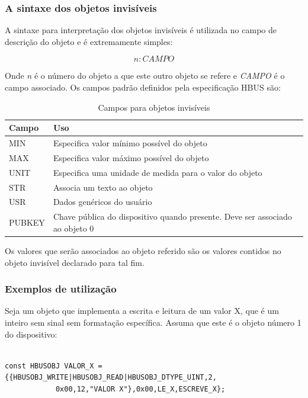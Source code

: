 \documentclass[11pt]{report}
\begin{document}
\subsubsection*{A sintaxe dos objetos invisíveis}

A sintaxe para interpretação dos objetos invisíveis é utilizada no campo de descrição do objeto e é extremamente simples:

\begin{equation*}
n:CAMPO
\end{equation*}

Onde \textit{n} é o número do objeto a que este outro objeto se refere e \textit{CAMPO} é o campo associado. Os campos padrão definidos pela especificação HBUS são:

\begin{table}[H]
\centering
\begin{tabular}{l l}
\hline
Campo		&		Uso\\
\hline
MIN			&		Especifica valor mínimo possível do objeto\\
MAX			&		Especifica valor máximo possível do objeto\\
UNIT			&		Especifica uma unidade de medida para o valor do objeto\\
STR			&		Associa um texto ao objeto\\
USR			&		Dados genéricos do usuário\\
PUBKEY		&		Chave pública do dispositivo quando presente. Deve ser associado ao objeto 0\\
\hline
\end{tabular}
\caption{Campos para objetos invisíveis}
\end{table}

Os valores que serão associados ao objeto referido são os valores contidos no objeto invisível declarado para tal fim.

\subsubsection*{Exemplos de utilização}

Seja um objeto que implementa a escrita e leitura de um valor X, que é um inteiro sem sinal sem formatação específica. Assuma que este é o objeto número 1 do dispositivo:

\begin{verbatim}

const HBUSOBJ VALOR_X = {{HBUSOBJ_WRITE|HBUSOBJ_READ|HBUSOBJ_DTYPE_UINT,2,
			0x00,12,"VALOR X"},0x00,LE_X,ESCREVE_X};

\end{verbatim}
\end{document}
